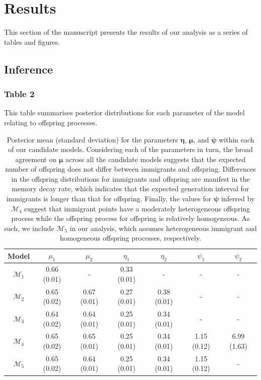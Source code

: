 \documentclass[
]{article}
\begin{document}
\hypertarget{results}{%
\section{Results}\label{results}}

This section of the manuscript presents the results of our analysis as a
series of tables and figures.

\hypertarget{inference}{%
\subsection{Inference}\label{inference}}

\hypertarget{table-2}{%
\subsubsection{Table 2}\label{table-2}}

This table summarises posterior distributions for each parameter of the
model relating to offspring processes.

\begin{table}[ht]
\centering
\begin{tabular}{|c|c|c|c|c|c|c|}
  \hline
Model & $\mu_1$ & $\mu_2$ & $\eta_1$ & $\eta_2$ & $\psi_1$ & $\psi_2$ \\ 
  \hline
$\mathcal M_1$ & 0.66 (0.01) & - & 0.33 (0.01) & - & - & - \\ 
  $\mathcal M_2$ & 0.65 (0.02) & 0.67 (0.01) & 0.27 (0.01) & 0.38 (0.01) & - & - \\ 
  $\mathcal M_3$ & 0.64 (0.02) & 0.64 (0.01) & 0.25 (0.01) & 0.34 (0.01) & - & - \\ 
  $\mathcal M_4$ & 0.65 (0.02) & 0.65 (0.01) & 0.25 (0.01) & 0.34 (0.01) & 1.15 (0.12) & 6.99 (1.63) \\ 
  $\mathcal M_5$ & 0.65 (0.02) & 0.64 (0.01) & 0.25 (0.01) & 0.34 (0.01) & 1.15 (0.12) & - \\ 
   \hline
\end{tabular}
\caption{Posterior mean (standard deviation) for the parameters $\boldsymbol \eta$, $\boldsymbol \mu$, and $\boldsymbol \psi$ within each of our candidate models. Considering each of the parameters in turn, the broad agreement on $\boldsymbol \mu$ across all the candidate models suggests that the expected number of offspring does not differ between immigrants and offspring. Differences in the offspring distributions for immigrants and offspring are manifest in the memory decay rate, which indicates that the expected generation interval for immigrants is longer than that for offspring. Finally, the values for $\boldsymbol \psi$ inferred by $\mathcal M_4$ suggest that immigrant points have a moderately heterogeneous offspring process while the offspring process for offspring is relatively homogeneous. As such, we include $\mathcal M_5$ in our analysis, which assumes heterogeneous immigrant and homogeneous offspring processes, respectively.} 
\label{tab:parameter_estimates}
\end{table}
\end{document}
